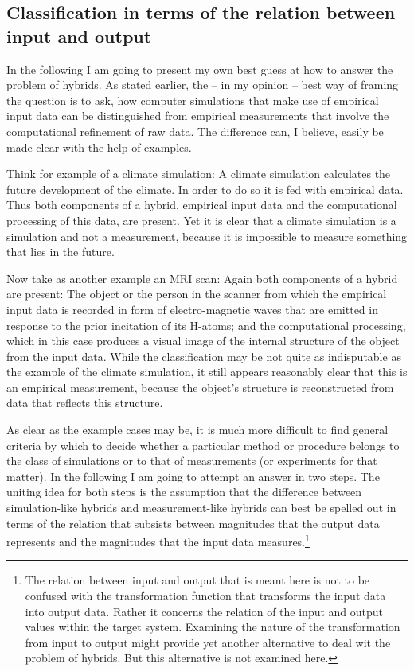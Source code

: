 \documentclass[12pt, a4paper]{article}
\numberwithin{equation}{section}
\begin{document}
%
%
%
%

\subsection{Classification in terms of the relation between input and output}

In the following I am going to present my own best guess at how to answer the problem of hybrids. As stated earlier, the -- in my opinion -- best way of framing the question is to ask, how computer simulations that make use of empirical input data can be distinguished from empirical measurements that involve the computational refinement of raw data. The difference can, I believe, easily be made clear with the help of examples. 

Think for example of a climate simulation: A climate simulation calculates the future development of the climate. In order to do so it is fed with empirical data. Thus both components of a hybrid, empirical input data and the computational processing of this data, are present. Yet it is clear that a climate simulation is a simulation and not a measurement, because it is impossible to measure something that lies in the future. 

Now take as another example an MRI scan: Again both components of a hybrid are present: The object or the person in the scanner from which the empirical input data is recorded in form of electro-magnetic waves that are emitted in response to the prior incitation of its H-atoms; and the computational processing, which in this case produces a visual image of the internal structure of the object from the input data. While the classification may be not quite as indisputable as the example of the climate simulation, it still appears reasonably clear that this is an empirical measurement, because the object's structure is reconstructed from data that reflects this structure.

As clear as the example cases may be, it is much more difficult to find general criteria by which to decide whether a particular method or procedure belongs to the class of simulations or to that of  measurements (or experiments for that matter). In the following I am going to attempt an answer in two steps. The uniting idea for both steps is the assumption that the difference between simulation-like hybrids and measurement-like hybrids can best be spelled out in terms of the relation that subsists between magnitudes that the output data represents and the magnitudes that the input data measures.\footnote{The relation between input and output that is meant here is not to be confused with the transformation function that transforms the input data into output data. Rather it concerns the relation of the input and output values within the target system. Examining the nature of the transformation from input to output might provide yet another alternative to deal wit the problem of hybrids. But this alternative is not examined here.}
\end{document}
